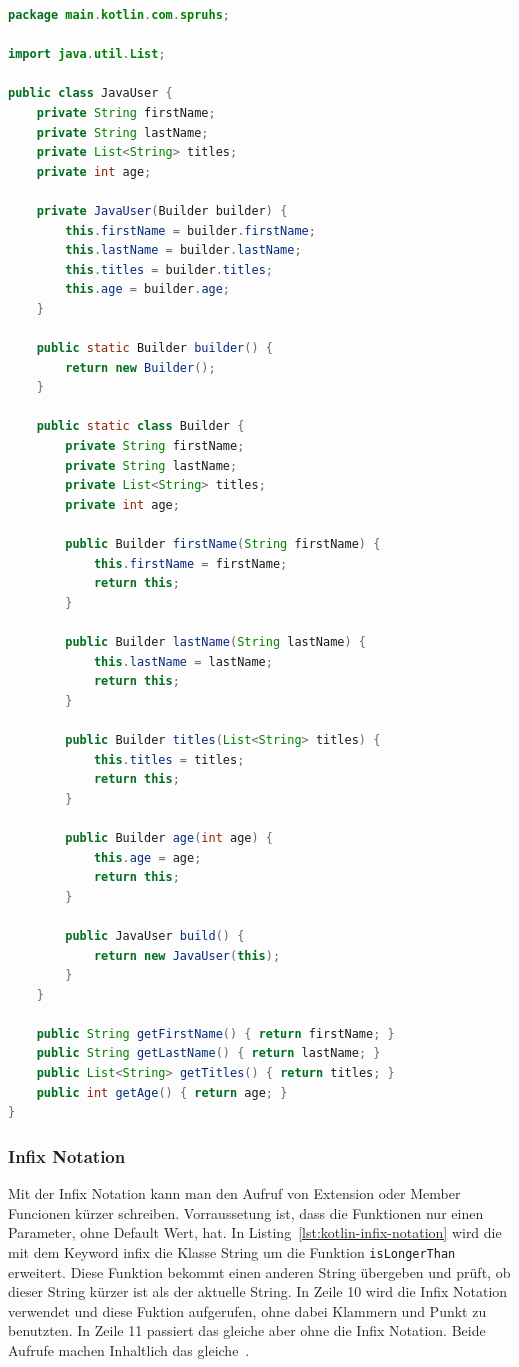 \documentclass[11pt]{article}
\begin{document}
    \begin{lstlisting}[language=Java, caption={JavaUser.kt}, label={lst:java-builder-pattern}]
        package main.kotlin.com.spruhs;

import java.util.List;

public class JavaUser {
    private String firstName;
    private String lastName;
    private List<String> titles;
    private int age;

    private JavaUser(Builder builder) {
        this.firstName = builder.firstName;
        this.lastName = builder.lastName;
        this.titles = builder.titles;
        this.age = builder.age;
    }

    public static Builder builder() {
        return new Builder();
    }

    public static class Builder {
        private String firstName;
        private String lastName;
        private List<String> titles;
        private int age;

        public Builder firstName(String firstName) {
            this.firstName = firstName;
            return this;
        }

        public Builder lastName(String lastName) {
            this.lastName = lastName;
            return this;
        }

        public Builder titles(List<String> titles) {
            this.titles = titles;
            return this;
        }

        public Builder age(int age) {
            this.age = age;
            return this;
        }

        public JavaUser build() {
            return new JavaUser(this);
        }
    }

    public String getFirstName() { return firstName; }
    public String getLastName() { return lastName; }
    public List<String> getTitles() { return titles; }
    public int getAge() { return age; }
}
    \end{lstlisting}

    \subsubsection{Infix Notation}
    Mit der Infix Notation kann man den Aufruf von Extension oder Member Funcionen kürzer schreiben.
    Vorraussetung ist, dass die Funktionen nur einen Parameter, ohne Default Wert, hat.
    In Listing~\ref{lst:kotlin-infix-notation} wird die mit dem Keyword infix die Klasse String um die Funktion \texttt{isLongerThan} erweitert.
    Diese Funktion bekommt einen anderen String übergeben und prüft, ob dieser String kürzer ist als der aktuelle String.
    In Zeile 10 wird die Infix Notation verwendet und diese Fuktion aufgerufen, ohne dabei Klammern und Punkt zu benutzten.
    In Zeile 11 passiert das gleiche aber ohne die Infix Notation.
    Beide Aufrufe machen Inhaltlich das gleiche~\cite{kotlin-infix-notation}.
\end{document}
